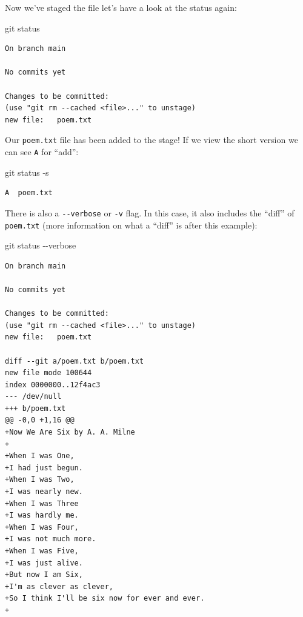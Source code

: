 \documentclass[
  letterpaper,
  DIV=11,
  numbers=noendperiod]{scrartcl}
\newenvironment{Shaded}{\begin{snugshade}}{\end{snugshade}}
\newcommand{\NormalTok}[1]{\textcolor[rgb]{0.00,0.23,0.31}{#1}}
\newcommand{\SpecialCharTok}[1]{\textcolor[rgb]{0.37,0.37,0.37}{#1}}
\begin{document}
Now we've staged the file let's have a look at the status again:

\begin{Shaded}
\begin{Highlighting}[]
\NormalTok{git status}
\end{Highlighting}
\end{Shaded}

\begin{verbatim}
On branch main

No commits yet

Changes to be committed:
(use "git rm --cached <file>..." to unstage)
new file:   poem.txt
\end{verbatim}

Our \texttt{poem.txt} file has been added to the stage! If we view the
short version we can see \texttt{A} for ``add'':

\begin{Shaded}
\begin{Highlighting}[]
\NormalTok{git status }\SpecialCharTok{{-}}\NormalTok{s}
\end{Highlighting}
\end{Shaded}

\begin{verbatim}
A  poem.txt
\end{verbatim}

There is also a \texttt{-\/-verbose} or \texttt{-v} flag. In this case,
it also includes the ``diff'' of \texttt{poem.txt} (more information on
what a ``diff'' is after this example):

\begin{Shaded}
\begin{Highlighting}[]
\NormalTok{git status }\SpecialCharTok{{-}{-}}\NormalTok{verbose}
\end{Highlighting}
\end{Shaded}

\begin{verbatim}
On branch main

No commits yet

Changes to be committed:
(use "git rm --cached <file>..." to unstage)
new file:   poem.txt

diff --git a/poem.txt b/poem.txt
new file mode 100644
index 0000000..12f4ac3
--- /dev/null
+++ b/poem.txt
@@ -0,0 +1,16 @@
+Now We Are Six by A. A. Milne
+
+When I was One,
+I had just begun.
+When I was Two,
+I was nearly new.
+When I was Three
+I was hardly me.
+When I was Four,
+I was not much more.
+When I was Five,
+I was just alive.
+But now I am Six,
+I'm as clever as clever,
+So I think I'll be six now for ever and ever.
+
\end{verbatim}
\end{document}
